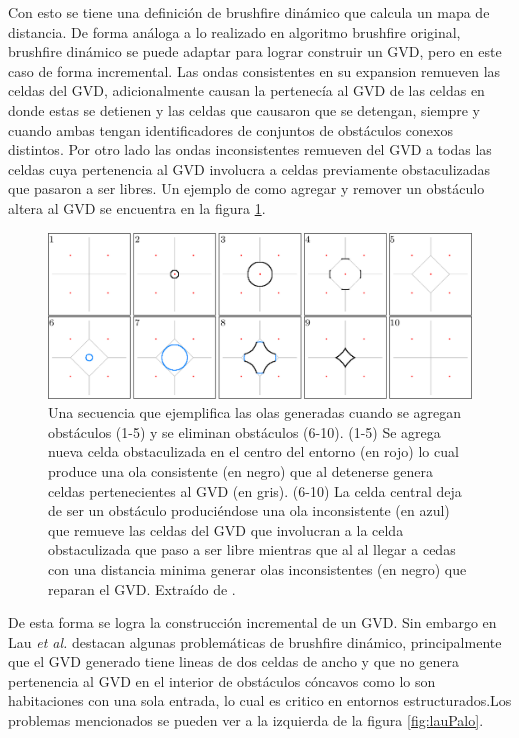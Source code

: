 Con esto se tiene una definición de brushfire dinámico que calcula un mapa de distancia. De forma análoga a lo realizado en algoritmo brushfire original, brushfire dinámico se puede adaptar para lograr construir un GVD, pero en este caso de forma incremental. Las ondas consistentes en su expansion remueven las celdas del GVD, adicionalmente causan la pertenecía al GVD de las celdas en donde estas se detienen y las celdas que causaron que se detengan, siempre y cuando ambas tengan identificadores de conjuntos de obstáculos conexos distintos. Por otro lado las ondas inconsistentes remueven del GVD a todas las celdas cuya pertenencia al GVD involucra a celdas previamente obstaculizadas que pasaron a ser libres. Un ejemplo de como agregar y remover un obstáculo altera al GVD se encuentra en la figura \ref{fig:ejWavesIncKarlra}. 

\begin{figure}[H]
  \center
  \includegraphics[width=1\linewidth]{imagenes/wavesKalra.png}
  \caption{Una secuencia que ejemplifica las olas generadas cuando se agregan obstáculos (1-5) y se eliminan obstáculos (6-10). (1-5) Se agrega nueva celda obstaculizada en el centro del entorno (en rojo) lo cual produce una ola consistente (en negro) que al detenerse genera celdas pertenecientes al GVD (en gris). (6-10) La celda central deja de ser un obstáculo produciéndose una ola inconsistente (en azul) que remueve las celdas del GVD que involucran a la celda obstaculizada que paso a ser libre mientras que al al llegar a cedas con una distancia minima generar olas inconsistentes (en negro) que reparan el GVD. Extraído de \cite{kalra2009incremental}.}\label{fig:ejWavesIncKarlra}
\end{figure} 


De esta forma se logra la construcción incremental de un GVD. Sin embargo en \cite{Lau2013} Lau \textit{et al.} destacan algunas problemáticas de brushfire dinámico, principalmente que el GVD generado tiene lineas de dos celdas de ancho y que no genera pertenencia al GVD en el interior de obstáculos cóncavos como lo son habitaciones con una sola entrada, lo cual es critico en entornos estructurados.Los problemas mencionados se pueden ver a la izquierda de la figura \ref{fig:lauPalo}.

